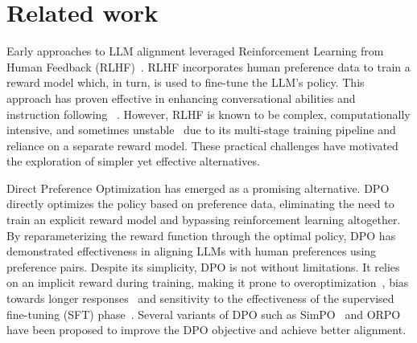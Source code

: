 \section{Related work}


Early approaches to LLM alignment leveraged Reinforcement Learning from Human Feedback (RLHF)~\cite{ouyang2022traininglanguagemodelsfollow, christiano2023deepreinforcementlearninghuman}. RLHF incorporates human preference data to train a reward model which, in turn, is used to fine-tune the LLM's policy. This approach has proven effective in enhancing conversational abilities and instruction following ~\cite{bai2022traininghelpfulharmlessassistant, stiennon2022learningsummarizehumanfeedback}. However, RLHF is known to be complex, computationally intensive, and sometimes unstable~\cite{ramamurthy2023reinforcementlearningnotnatural} due to its multi-stage training pipeline and reliance on a separate reward model. These practical challenges have motivated the exploration of simpler yet effective alternatives.

Direct Preference Optimization \cite{rafailov2024directpreferenceoptimizationlanguage} has emerged as a promising alternative. DPO directly optimizes the policy based on preference data, eliminating the need to train an explicit reward model and bypassing reinforcement learning altogether. By reparameterizing the reward function through the optimal policy, DPO has demonstrated effectiveness in aligning LLMs with human preferences using preference pairs. Despite its simplicity, DPO is not without limitations. It relies on an implicit reward during training, making it prone to overoptimization~\cite{rafailov2024scalinglawsrewardmodel}, bias towards longer responses~\cite{park2024disentanglinglengthqualitydirect} and sensitivity to the effectiveness of the supervised fine-tuning (SFT) phase~\cite{feng2024analyzingunderstandinglimitationsdpo}. Several variants of DPO such as SimPO~\cite{meng2024simposimplepreferenceoptimization} and ORPO~\cite{hong2024orpomonolithicpreferenceoptimization} have been proposed to improve the DPO objective and achieve better alignment.

